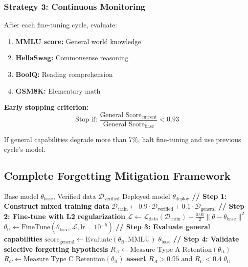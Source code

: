 \documentclass[12pt,a4paper]{article}
\theoremstyle{definition}
\begin{document}
\subsubsection{Strategy 3: Continuous Monitoring}

After each fine-tuning cycle, evaluate:

\begin{enumerate}
    \item \textbf{MMLU score:} General world knowledge
    \item \textbf{HellaSwag:} Commonsense reasoning
    \item \textbf{BoolQ:} Reading comprehension
    \item \textbf{GSM8K:} Elementary math
\end{enumerate}

\textbf{Early stopping criterion:}
\begin{equation}
\text{Stop if: } \frac{\text{General Score}_{\text{current}}}{\text{General Score}_{\text{base}}} < 0.93
\end{equation}

If general capabilities degrade more than 7\%, halt fine-tuning and use previous cycle's model.

\subsection{Complete Forgetting Mitigation Framework}

\begin{algorithm}[htbp]
\caption{Catastrophic Forgetting Mitigation Protocol}
\begin{algorithmic}[1]
\Require Base model $\theta_{\text{base}}$, Verified data $\mathcal{D}_{\text{verified}}$
\Ensure Deployed model $\theta_{\text{deploy}}$
\State
\State \textbf{// Step 1: Construct mixed training data}
\State $\mathcal{D}_{\text{train}} \gets 0.9 \cdot \mathcal{D}_{\text{verified}} + 0.1 \cdot \mathcal{D}_{\text{general}}$
\State
\State \textbf{// Step 2: Fine-tune with L2 regularization}
\State $\mathcal{L} \gets \mathcal{L}_{\text{data}}(\mathcal{D}_{\text{train}}) + \frac{0.01}{2}\|\theta - \theta_{\text{base}}\|^2$
\State $\theta_{\text{ft}} \gets \text{FineTune}(\theta_{\text{base}}, \mathcal{L}, \text{lr}=10^{-5})$
\State
\State \textbf{// Step 3: Evaluate general capabilities}
\State $\text{score}_{\text{general}} \gets \text{Evaluate}(\theta_{\text{ft}}, \text{MMLU})$
    \State \Return $\theta_{\text{base}}$ 
\EndIf
\State
\State \textbf{// Step 4: Validate selective forgetting hypothesis}
\State $R_A \gets \text{Measure Type A Retention}(\theta_{\text{ft}})$ 
\State $R_C \gets \text{Measure Type C Retention}(\theta_{\text{ft}})$ 
\State \textbf{assert} $R_A > 0.95$ and $R_C < 0.4$ 
\State
\State \Return $\theta_{\text{ft}}$
\end{algorithmic}
\end{algorithm}
\end{document}
